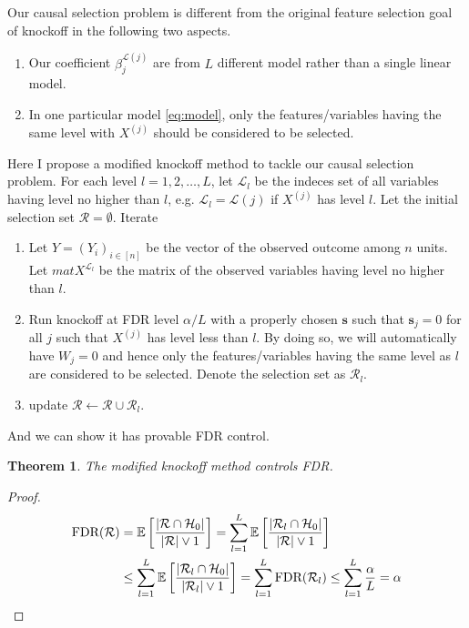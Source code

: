 \documentclass[11pt]{article}
\newtheorem{thm}{Theorem}[section]
\newcommand{\cH}{\mathcal{H}}
\newcommand{\cR}{\mathcal{R}}
\newcommand{\cL}{\mathcal{L}}
\newcommand{\EE}{\mathbb{E}}
\newcommand{\FDR}{\textnormal{FDR}}
\newcommand{\br}[1]{\left[ #1 \right]}
\newcommand{\vct}[1]{\boldsymbol{#1}}
\newcommand{\mam}{\vee}
\begin{document}
Our causal selection problem is different from the original feature selection goal of knockoff in the following two aspects.
\begin{enumerate}
    \item Our coefficient $\beta^{\cL(j)}_j$ are from $L$ different model rather than a single linear model.
    \item In one particular model \eqref{eq:model}, only the features/variables having the same level with $X^{(j)}$ should be considered to be selected.
\end{enumerate}

Here I propose a modified knockoff method to tackle our causal selection problem. For each level $l = 1, 2, \ldots, L$, let $\cL_l$ be the indeces set of all variables having level no higher than $l$, e.g. $\cL_l = \cL(j)$ if $X^{(j)}$ has level $l$. Let the initial selection set $\cR = \emptyset$. Iterate
\begin{enumerate}
    \item Let $Y = (Y_i)_{i \in [n]}$ be the vector of the observed outcome among $n$ units. Let $mat X^{\cL_l}$ be the matrix of the observed variables having level no higher than $l$.
    \item Run knockoff at FDR level $\alpha / L$ with a properly chosen $\vct s$ such that $\vct s_j = 0$ for all $j$ such that $X^{(j)}$ has level less than $l$. By doing so, we will automatically have $W_j = 0$ and hence only the features/variables having the same level as $l$ are considered to be selected. Denote the selection set as $\cR_l$.
    \item update $\cR \leftarrow \cR \cup \cR_l$.
\end{enumerate}

And we can show it has provable FDR control.
\begin{thm}
    The modified knockoff method controls FDR.
\end{thm}
\begin{proof}
    \begin{align*}
        \FDR(\cR)
        &= \EE \br{\frac{|\cR \cap \cH_0|}{|\cR| \mam 1}}
        = \sum_{l=1}^L \EE \br{\frac{|\cR_l \cap \cH_0|}{|\cR| \mam 1}} \\
        &\leq \sum_{l=1}^L \EE \br{\frac{|\cR_l \cap \cH_0|}{|\cR_l| \mam 1}}
        = \sum_{l=1}^L \FDR(\cR_l)
        \leq \sum_{l=1}^L \frac{\alpha}{L}
        = \alpha
    \end{align*}  
\end{proof}
\end{document}
